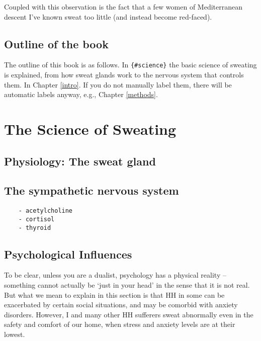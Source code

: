 \documentclass[]{book}
\begin{document}
Coupled with this observation is the fact that a few women of Mediterranean descent I've known sweat too little (and instead become red-faced).

\hypertarget{outline-of-the-book}{%
\section{Outline of the book}\label{outline-of-the-book}}

The outline of this book is as follows.
In \texttt{\{\#science\}} the basic science of sweating is explained, from how sweat glands work to the nervous system that controls them.
In Chapter \ref{intro}. If you do not manually label them, there will be automatic labels anyway, e.g., Chapter \ref{methods}.

\hypertarget{science}{%
\chapter{The Science of Sweating}\label{science}}

\hypertarget{physiology-the-sweat-gland}{%
\section{Physiology: The sweat gland}\label{physiology-the-sweat-gland}}

\hypertarget{the-sympathetic-nervous-system}{%
\section{The sympathetic nervous system}\label{the-sympathetic-nervous-system}}

\begin{verbatim}
    - acetylcholine
    - cortisol 
    - thyroid
\end{verbatim}

\hypertarget{psychological-influences}{%
\section{Psychological Influences}\label{psychological-influences}}

To be clear, unless you are a dualist, psychology has a physical reality -- something cannot actually be `just in your head' in the sense that it is not real.
But what we mean to explain in this section is that HH in some can be exacerbated by certain social situations, and may be comorbid with anxiety disorders.
However, I and many other HH sufferers sweat abnormally even in the safety and comfort of our home, when stress and anxiety levels are at their lowest.
\end{document}
